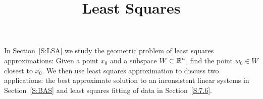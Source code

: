 \documentclass{ximera}
\title{Least Squares}
\begin{document}
\begin{abstract}
\end{abstract}
\maketitle

\normalsize


In Section~\ref{S:LSA} we study the geometric problem of least squares approximations: 
Given a point $x_0$ and a subspace $W\subset\mbox{$\mathbb{R}$}^n$, find the point $w_0\in W$ 
closest to $x_0$.  We then use least squares approximation to discuss two applications: 
the best approximate solution to an inconsistent linear systems in Section~\ref{S:BAS} and
least squares fitting of data in Section~\ref{S:7.6}.   
\end{document}
